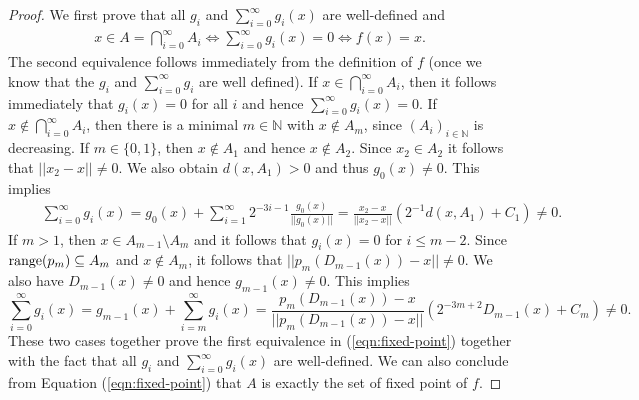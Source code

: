 \documentclass[a4paper]{amsart}
\def\IN{{\mathbb{N}}}
\def\In{\subseteq}
\def\range{{\rm range}}
\theoremstyle{definition}
\begin{document}
\begin{proof}
We first prove that all $g_i$ and $\sum_{i=0}^\infty g_i(x)$ are well-defined and
\begin{eqnarray}
\label{eqn:fixed-point}
x\in A=\bigcap_{i=0}^\infty A_i\iff\sum_{i=0}^\infty g_i(x)=0\iff f(x)=x.
\end{eqnarray}
The second equivalence follows immediately from the definition of $f$ (once we know that the $g_i$ and $\sum_{i=0}^\infty g_i$ are well defined).
If $x\in\bigcap_{i=0}^\infty A_i$, then it follows immediately that $g_i(x)=0$ for all $i$ and hence $\sum_{i=0}^\infty g_i(x)=0$.
If $x\not\in\bigcap_{i=0}^\infty A_i$, then there is a minimal $m\in\IN$ with $x\not\in A_m$, since $(A_i)_{i\in\IN}$ is decreasing.
If $m\in\{0,1\}$, then $x\not\in A_1$ and hence $x\not\in A_2$. Since $x_2\in A_2$ it follows that $||x_2-x||\not=0$.
We also obtain $d(x,A_1)>0$ and thus $g_0(x)\not=0$. This implies
\begin{eqnarray}
\label{eqn:fixed-point-0}\qquad
\sum_{i=0}^\infty g_i(x)=g_0(x)+\sum_{i=1}^\infty 2^{-3i-1}\frac{g_0(x)}{||g_0(x)||}=\frac{\displaystyle x_2-x}{\displaystyle||x_2-x||}(2^{-1}d(x,A_1)+C_1)\not=0.
\end{eqnarray}
If $m>1$, then $x\in A_{m-1}\setminus A_m$ and it follows that $g_i(x)=0$ for $i\leq m-2$.
Since $\range(p_m)\In A_m$ and $x\not\in A_m$, it follows that $||p_{m}(D_{m-1}(x))-x||\not=0$.
We also have $D_{m-1}(x)\not=0$ and hence $g_{m-1}(x)\not=0$. This implies
\[\sum_{i=0}^\infty g_i(x)=g_{m-1}(x)+\sum_{i=m}^\infty g_i(x)=
\frac{\displaystyle p_{m}(D_{m-1}(x))-x}{\displaystyle||p_{m}(D_{m-1}(x))-x||}(2^{-3m+2}D_{m-1}(x)+C_m)\not=0.\]
These two cases together prove the first equivalence in (\ref{eqn:fixed-point}) together with the fact that all $g_i$
and $\sum_{i=0}^\infty g_i(x)$ are well-defined. 
We can also conclude from Equation (\ref{eqn:fixed-point}) that $A$ is exactly the set of fixed point of $f$.


\end{proof}
\end{document}
